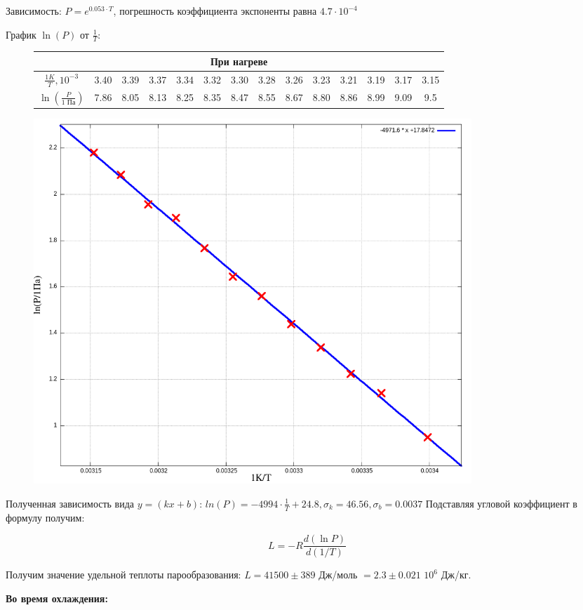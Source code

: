 \documentclass[a4paper,10pt]{article} %
\begin{document}
Зависимость: $P = e^{0.053\cdot T}$, погрешность коэффициента экспоненты равна $4.7\cdot 10^{-4}$ 




График $\ln(P)$ от $\frac{1}{T}$:

\begin{figure}[H]
	\centering
	\begin{tabular}{|c|c|c|c|c|c|c|c|c|c|c|c|c|c|}
		\hline
		\multicolumn{14}{|c|}{При нагреве}\\
		\hline
		$\frac{1 K}{T}, 10^{-3}$&3.40&3.39&3.37&3.34&3.32&3.30&3.28&3.26&3.23&3.21&3.19&3.17&3.15\\\hline
		$\ln(\frac{P}{\text{1 Па}})$&7.86&8.05&8.13&8.25&8.35&8.47&8.55&8.67&8.80&8.86&8.99&9.09&9.5\\\hline
	\end{tabular}
\end{figure}



\begin{figure}[H]
	\centering
	\includegraphics[width=0.8\textwidth]{2-4-1-2-res.png}
\end{figure}

Полученная зависимость вида $y = (kx + b)$:
\(ln(P) = -4994\cdot \frac{1}{T} + 24.8, \sigma_k = 46.56,  \sigma_b = 0.0037\)
Подставляя угловой коэффициент в формулу получим:

$$ L = -R\frac{d(\ln P)}{d(1/T)} $$

Получим значение удельной теплоты парообразования: $L = 41500 \pm 389$ Дж/моль $= 2.3 \pm 0.021$ $10^{6}$ Дж/кг.

\medskip

\textbf{Во время охлаждения:}
\end{document}
